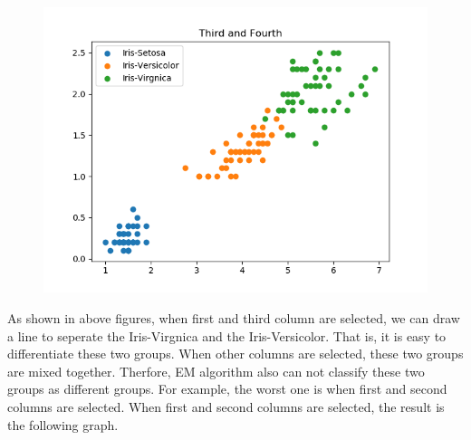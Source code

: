 \documentclass[a4paper]{article}
\begin{document}
\begin{figure}[h!]
\begin{minipage}[t]{6.5cm}
		\end{minipage}
		\hspace{2cm}
		\begin{minipage}[t]{6.5cm}
			\includegraphics[width=1.0\textwidth]{34.png}
		\end{minipage}
	\end{figure}
	
	As shown in above figures, when first and third column are selected, we can draw a line to seperate the Iris-Virgnica and the Iris-Versicolor. That is, it is easy to differentiate these two groups. When other columns are selected, these two groups are mixed together. Therfore, EM algorithm also can not classify these two groups as different groups. For example, the worst one is when first and second columns are selected. When first and second columns are selected, the result is the following graph.
	
\end{document}
